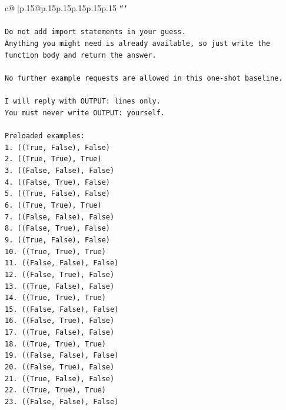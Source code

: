\documentclass{article}
\begin{document}
{\begin{supertabular}{c@{$\;$}|p{.15\linewidth}@{}p{.15\linewidth}p{.15\linewidth}p{.15\linewidth}p{.15\linewidth}p{.15\linewidth}}
{{{\texttt{```} \\
\\ 
\texttt{Do not add import statements in your guess.} \\
\texttt{Anything you might need is already available, so just write the function body and return the answer.} \\
\\ 
\texttt{No further example requests are allowed in this one{-}shot baseline.} \\
\\ 
\texttt{I will reply with OUTPUT: lines only.} \\
\texttt{You must never write OUTPUT: yourself.} \\
\\ 
\texttt{Preloaded examples:} \\
\texttt{1. ((True, False), False)} \\
\texttt{2. ((True, True), True)} \\
\texttt{3. ((False, False), False)} \\
\texttt{4. ((False, True), False)} \\
\texttt{5. ((True, False), False)} \\
\texttt{6. ((True, True), True)} \\
\texttt{7. ((False, False), False)} \\
\texttt{8. ((False, True), False)} \\
\texttt{9. ((True, False), False)} \\
\texttt{10. ((True, True), True)} \\
\texttt{11. ((False, False), False)} \\
\texttt{12. ((False, True), False)} \\
\texttt{13. ((True, False), False)} \\
\texttt{14. ((True, True), True)} \\
\texttt{15. ((False, False), False)} \\
\texttt{16. ((False, True), False)} \\
\texttt{17. ((True, False), False)} \\
\texttt{18. ((True, True), True)} \\
\texttt{19. ((False, False), False)} \\
\texttt{20. ((False, True), False)} \\
\texttt{21. ((True, False), False)} \\
\texttt{22. ((True, True), True)} \\
\texttt{23. ((False, False), False)} \\
}}}
\end{supertabular}}
\end{document}
